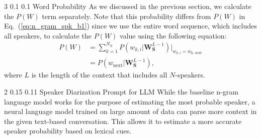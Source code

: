 \documentclass{article}
\makeatletter
\renewcommand{\subsection}{\@startsection
  {subsection}%
  {2}%
  {}%
  {0.15\baselineskip}%
  {0.11\baselineskip}%
  {}}%
\renewcommand{\subsubsection}{\@startsection
  {subsubsection}%
  {3}%
  {}%
  {0.1\baselineskip}%
  {0.1\baselineskip}%
  {}}%
\makeatother
\begin{document}
\subsubsection{Word Probability}
As we discussed in the previous section, we calculate the $P(W)$ term separately. Note that this probability differs from $P(W)$ in Eq.~(\ref{eq:n_gram_spk_b1}) since we use the entire word sequence, which includes all speakers, to calculate the $P(W)$ value using the following equation:
\begin{align}
P(W) & =\sum_{k=1}^{N_S} P(w_{k, i}|\mathbf{W}_{\mathbf{S}}^{L-1})\rvert_{w_{k,i}=w_{\text{k, next}}} \\
& =P(w_{\text{next}}|\mathbf{W}_{\mathbf{S}}^{L-1}),
\end{align}
where $L$ is the length of the context that includes all $N$-speakers.

\subsection{Speaker Diarization Prompt for LLM}
While the baseline n-gram language model works for the purpose of estimating the most probable speaker, a neural language model trained on large amount of data can parse more context in the given text-based conversation. This allows it to estimate a more accurate speaker probability based on lexical cues.
\end{document}
